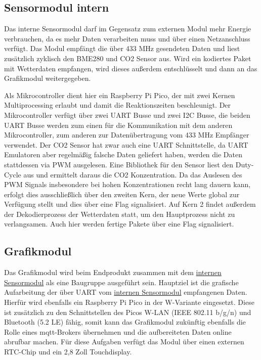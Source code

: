\documentclass[a4paper,11pt]{article}
\begin{document}
\subsection{Sensormodul intern}
\label{subsub:sensorModul_int}

Das interne Sensormodul darf im Gegensatz zum externen Modul mehr Energie verbrauchen, da es mehr Daten verarbeiten muss und über einen Netzanschluss verfügt. 
Das Modul empfängt die über 433 MHz gesendeten Daten und liest zusätzlich zyklisch den BME280 und CO2 Sensor aus. Wird ein kodiertes Paket mit Wetterdaten empfangen, 
wird dieses außerdem entschlüsselt und dann an das Grafikmodul weitergegeben. 

\vspace{0.3cm}
\noindent
Als Mikrocontroller dient hier ein Raspberry Pi Pico, der mit zwei Kernen Multiprocessing erlaubt und damit die Reaktionszeiten beschleunigt. Der Mikrocontroller
verfügt über zwei UART Busse und zwei I2C Busse, die beiden UART Busse werden zum einen für die Kommunikation mit dem anderen Mikrocontroller, zum anderen zur Datenübertragung
vom 433 MHz Empfänger verwendet. Der CO2 Sensor hat zwar auch eine UART Schnittstelle, da UART Emulatoren aber regelmäßig falsche Daten geliefert haben, werden die Daten stattdessen
via PWM ausgelesen. Eine Bibliothek für den Sensor liest den Duty-Cycle aus und ermittelt daraus die CO2 Konzentration. Da das Auslesen des PWM Signals insbesondere bei hohen
Konzentrationen recht lang dauern kann, erfolgt dies ausschließlich über den zweiten Kern, der neue Werte global zur Verfügung stellt und dies über eine Flag signalisiert. 
Auf Kern 2 findet außerdem der Dekodierprozess der Wetterdaten statt, um den Hauptprozess nicht zu verlangsamen. Auch hier werden fertige Pakete über eine Flag signalisiert. 

\subsection{Grafikmodul}
\label{subsub:grafikmodul}

Das Grafikmodul wird beim Endprodukt zusammen mit dem \hyperref[subsub:sensorModul_int]{internen Sensormodul} als eine Baugruppe ausgeführt sein.
Hauptziel ist die grafische Aufarbeitung der über UART vom \hyperref[subsub:sensorModul_int]{internen Sensormodul} empfangenen Daten.
Hierfür wird ebenfalls ein Raspberry Pi Pico in der W-Variante eingesetzt.
Diese ist zusätzlich zu den Schnittstellen des Picos W-LAN (IEEE 802.11 b/g/n) und Bluetooth (5.2 LE) fähig, somit kann das Grafikmodul zukünftig ebenfalls die Rolle eines mqtt-Brokers übernehmen und die aufbereiteten Daten online abrufbar machen.
Für diese Aufgaben verfügt das Modul über einen externen RTC-Chip und ein 2,8 Zoll Touchdisplay.
\end{document}
